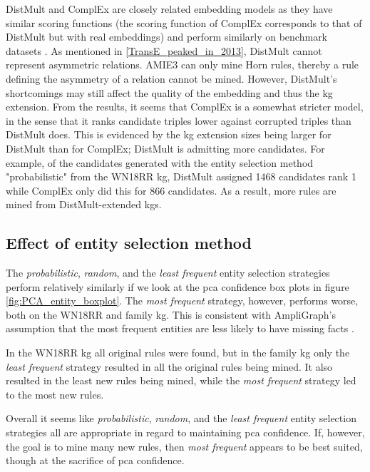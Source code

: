 DistMult and ComplEx are closely related embedding models as they have similar scoring functions (the scoring function of ComplEx corresponds to that of DistMult but with real embeddings) and perform similarly on benchmark datasets \cite{complEx}. As mentioned in \cref{TransE_peaked_in_2013}, DistMult cannot represent asymmetric relations. AMIE3 can only mine Horn rules, thereby a rule defining the asymmetry of a relation cannot be mined. However, DistMult's shortcomings may still affect the quality of the embedding and thus the \gls{kg} extension. From the results, it seems that ComplEx is a somewhat stricter model, in the sense that it ranks candidate triples lower against corrupted triples than DistMult does. This is evidenced by the \gls{kg} extension sizes being larger for DistMult than for ComplEx; DistMult is admitting more candidates. For example, of the candidates generated with the entity selection method "probabilistic" from the WN18RR \gls{kg}, DistMult assigned 1468 candidates rank 1 while ComplEx only did this for 866 candidates. As a result, more rules are mined from DistMult-extended \glspl{kg}. 

\newpage
\subsection{Effect of entity selection method}
The \textit{probabilistic}, \textit{random}, and the \textit{least frequent} entity selection strategies perform relatively similarly if we look at the \gls{pca} confidence box plots in figure \ref{fig:PCA_entity_boxplot}. The \textit{most frequent} strategy, however, performs worse, both on the WN18RR and family \gls{kg}. This is consistent with AmpliGraph's assumption that the most frequent entities are less likely to have missing facts \cite{kge_tutorial}.

In the WN18RR \gls{kg} all original rules were found, but in the family \gls{kg} only the \textit{least frequent} strategy resulted in all the original rules being mined. It also resulted in the least new rules being mined, while the \textit{most frequent} strategy led to the most new rules.

Overall it seems like \textit{probabilistic}, \textit{random}, and the \textit{least frequent} entity selection strategies all are appropriate in regard to maintaining \gls{pca} confidence. If, however, the goal is to mine many new rules, then \textit{most frequent} appears to be best suited, though at the sacrifice of \gls{pca} confidence.

